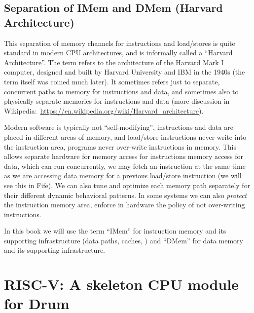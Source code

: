 
\subsection{Separation of IMem and DMem (Harvard Architecture)}


This separation of memory channels for instructions and load/stores is
quite standard in modern CPU architectures, and is informally called a
``Harvard Architecture''.  The term refers to the architecture of the
Harvard Mark I computer, designed and built by Harvard University and
IBM in the 1940s (the term itself was coined much later).  It
sometimes refers just to separate, concurrent paths to memory for
instructions and data, and sometimes also to physically separate
memories for instructions and data (more discussion in
Wikipedia:~\url{https://en.wikipedia.org/wiki/Harvard_architecture}).

Modern software is typically not ``self-modifying'', {\ie}
instructions and data are placed in different areas of memory, and
load/store instructions never write into the instruction area, {\ie}
programs never over-write instructions in memory.  This allows
separate hardware for memory access for instructions {\vs} memory
access for data, which can run concurrently, {\ie} we may fetch an
instruction at the same time as we are accessing data memory for a
previous load/store instruction (we will see this in Fife).  We can
also tune and optimize each memory path separately for their different
dynamic behavioral patterns.  In some systems we can also
\emph{protect} the instruction memory area, {\ie} enforce in hardware
the policy of not over-writing instructions.


In this book we will use the term ``IMem'' for instruction memory and
its supporting infrastructure (data paths, caches, {\etc}) and
``DMem'' for data memory and its supporting infrastructure.


\section{RISC-V: A skeleton CPU module for Drum}

